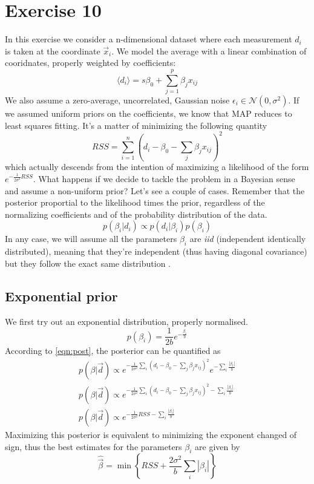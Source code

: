 \documentclass[a4paper,11pt,fleqn]{article}
\begin{document}
\section{Exercise 10}
In this exercise we consider a n-dimensional dataset where each measurement 
$d_i$ is taken at the coordinate $\vec{x}_i$. We model the average with 
a linear combination of cooridnates, properly weighted by coefficients:
\begin{equation*}
    \langle d_i \rangle = s\beta_0 + \sum_{j=1}^p \beta_j x_{ij}
\end{equation*}
We also assume a zero-average, uncorrelated, Gaussian noise $\epsilon_i \in \mathcal{N}(0,\sigma^2)$.
If we assumed uniform priors on the coefficients, we know that MAP reduces 
to least squares fitting. It's a matter of minimizing the following quantity 
\begin{equation}
    RSS = \sum_{i=1}^n (d_i - \beta_0 -\sum_j \beta_j x_{ij})^2
\end{equation}
which actually descends from the intention of maximizing a likelihood of 
the form $e^{-\frac{1}{2\sigma^2}RSS}$.
What happens if we decide to tackle the problem in a Bayesian sense and 
assume a non-uniform prior? Let's see a couple of cases. Remember that 
the posterior proportial to the likelihood times the prior, regardless 
of the normalizing coefficients and of the probability distribution of 
the data.
\begin{equation}
    \label{eqn:post}
    p(\beta_i|d_i) \propto p(d_i|\beta_i)p(\beta_i)
\end{equation}
In any case, we will assume all the parameters $\beta_i$ are \textit{iid} 
(independent identically distributed), meaning that they're independent 
(thus having diagonal covariance) but they follow the exact same 
distribution .



\subsection{Exponential prior}
We first try out an exponential distribution, properly normalised.
\begin{equation}
    p(\beta_i) = \frac{1}{2b}e^{-\frac{\beta_i}{b}}
\end{equation}
According to \ref{eqn:post}, the posterior can be quantified as 
\begin{gather*}
    p(\beta |\vec{d}) \propto e^{-\frac{1}{2\sigma^2}\sum_i (d_i-\beta_0-\sum_j \beta_j x_{ij})^2}e^{-\sum_i \frac{|\beta_i|}{b}} \\
    p(\beta |\vec{d}) \propto e^{-\frac{1}{2\sigma^2}\sum_i (d_i-\beta_0-\sum_j \beta_j x_{ij})^2-\sum_i \frac{|\beta_i|}{b}} \\
    p(\beta |\vec{d}) \propto e^{-\frac{1}{2\sigma^2}RSS-\sum_i \frac{|\beta_i|}{b}}
\end{gather*}
Maximizing this posterior is equivalent to minimizing the exponent changed of 
sign, thus the best estimates for the parameters $\beta_i$ are given by 
\begin{equation}
    \hat{\vec{\beta}} = \min{\left\{RSS + \frac{2\sigma^2}{b}\sum_i|\beta_i|\right\}}
\end{equation}
\end{document}
